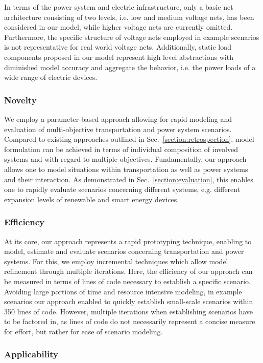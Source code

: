 In terms of the power system and electric infrastructure, only a basic net architecture consisting of two levels, i.e. low and medium voltage nets, has been considered in our model, while higher voltage nets are currently omitted. Furthermore, the specific structure of voltage nets employed in example scenarios is not representative for real world voltage nets. Additionally, static load components proposed in our model represent high level abstractions with diminished model accuracy and aggregate the behavior, i.e. the power loads of a wide range of electric devices.

\subsubsection*{Novelty}

We employ a parameter-based approach allowing for rapid modeling and evaluation of multi-objective transportation and power system scenarios. Compared to existing approaches outlined in Sec.~\ref{section:retrospection}, model formulation can be achieved in terms of individual composition of involved systems and with regard to multiple objectives. Fundamentally, our approach allows one to model situations within transportation as well as power systems and their interaction. As demonstrated in Sec.~\ref{section:evaluation}, this enables one to rapidly evaluate scenarios concerning different systems, e.g. different expansion levels of renewable and smart energy devices.

\subsubsection*{Efficiency}

At its core, our approach represents a rapid prototyping technique, enabling to model, estimate and evaluate scenarios concerning transportation and power systems. For this, we employ incremental techniques which allow model refinement through multiple iterations. Here, the efficiency of our approach can be measured in terms of lines of code necessary to establish a specific scenario. Avoiding large portions of time and resource intensive modeling, in example scenarios our approach enabled to quickly establish small-scale scenarios within 350 lines of code. However, multiple iterations when establishing scenarios have to be factored in, as lines of code do not necessarily represent a concise measure for effort, but rather for ease of scenario modeling.

\subsubsection*{Applicability}


